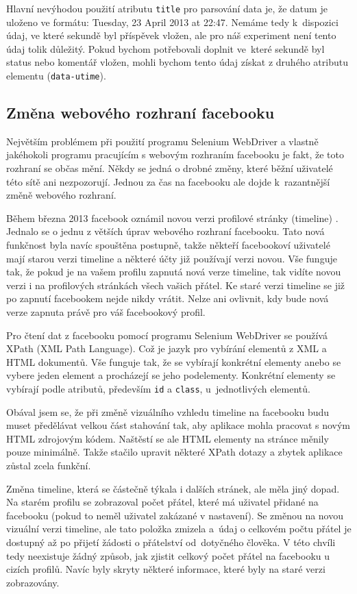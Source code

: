 \documentclass[thesis=M,czech]{FITthesis}[2013/05/10]
\begin{document}
Hlavní nevýhodou použití atributu \verb|title| pro parsování data je, že datum je uloženo ve formátu: Tuesday, 23 April 2013 at 22:47. Nemáme tedy k~dispozici údaj, ve které sekundě byl příspěvek vložen, ale pro náš experiment není tento údaj tolik důležitý. Pokud bychom potřebovali doplnit ve~které sekundě byl status nebo komentář vložen, mohli bychom tento údaj získat z druhého atributu elementu (\verb|data-utime|). 

\subsection{Změna webového rozhraní facebooku}

Největším problémem při použití programu Selenium WebDriver a vlastně jakéhokoli programu pracujícím s webovým rozhraním facebooku je fakt, že toto rozhraní se občas mění. Někdy se jedná o drobné změny, které běžní uživatelé této sítě ani nezpozorují. Jednou za čas na facebooku ale dojde k~razantnější změně webového rozhraní.

Během března 2013 facebook oznámil novou verzi profilové stránky (timeline) \cite{web:fbTimelineImprovements}. Jednalo se o jednu z větších úprav webového rozhraní facebooku. Tato nová funkčnost byla navíc spouštěna postupně, takže někteří facebookoví uživatelé mají starou verzi timeline a některé účty již používají verzi novou. Vše funguje tak, že pokud je na vašem profilu zapnutá nová verze timeline, tak vidíte novou verzi i na profilových stránkách všech vašich přátel. Ke staré verzi timeline se již po zapnutí facebookem nejde nikdy vrátit. Nelze ani ovlivnit, kdy bude nová verze zapnuta právě pro váš facebookový profil.

Pro čtení dat z facebooku pomocí programu Selenium WebDriver se používá XPath (XML Path Language). Což je jazyk pro vybírání elementů z XML a HTML dokumentů. Vše funguje tak, že se vybírají konkrétní elementy anebo se vybere jeden element a procházejí se jeho podelementy. Konkrétní elementy se vybírají podle atributů, především \verb|id| a \verb|class|, u~jednotlivých elementů.

Obával jsem se, že při změně vizuálního vzhledu timeline na facebooku budu muset předělávat velkou část stahování tak, aby aplikace mohla pracovat s novým HTML zdrojovým kódem. Naštěstí se ale HTML elementy na stránce měnily pouze minimálně. Takže stačilo upravit některé XPath dotazy a zbytek aplikace zůstal zcela funkční.

Změna timeline, která se částečně týkala i dalších stránek, ale měla jiný dopad. Na starém profilu se zobrazoval počet přátel, které má uživatel přidané na facebooku (pokud to neměl uživatel zakázané v nastavení). Se změnou na novou vizuální verzi timeline, ale tato položka zmizela a~údaj o celkovém počtu přátel je dostupný až po přijetí žádosti o přátelství od~dotyčného člověka. V této chvíli tedy neexistuje žádný způsob, jak zjistit celkový počet přátel na facebooku u cizích profilů. Navíc byly skryty některé informace, které byly na staré verzi zobrazovány.
\end{document}
